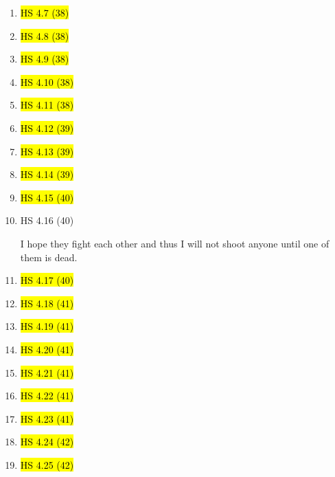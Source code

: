 \documentclass[11pt]{article}
\newcommand{\E}{\text{E}}
\newcommand{\bs}{\boldsymbol}
\newenvironment{note}{\begin{enumerate}[leftmargin=1em,topsep=0pt,noitemsep]}{\end{enumerate}}
\newenvironment{nnote}{\begin{enumerate}[leftmargin=.95em,topsep=0pt,noitemsep,label=$\bs{\cdot}$]}{\end{enumerate}}
\newcommand{\solution}{\boxed{\textbf{SOLUTION}}\hspace{.5em}}
\begin{document}
\begin{spacing}{1.1}
\begin{note}
\solution We solve the two subquestions one by one.
\begin{nnote}
\item First question is easy, and the expectation is $\$1.25X$. This means the expectation \textit{benefit} of switching is $\$0.25X$. Same is true for my opponent regardless of the value of $Y$. Therefore it seems we both should switch and will both benefit from it (which is a paradox). Furthermore, it seems we can switch forever and get our expectation benefits growing forever.
\item The correct way to solve this paradox is to replace our original prior which was in fact not a pdf (since for any $X$ we have $1/2$ and $1/2$ as probabilities and they never add to $1$ in total), with a new prior that IS a pdf. This can be demonstrated as below
$$
\E[\text{benefit}] = -m /2 + m / 2 = 0
$$
and thus switching does not yield profit at all. Also, when we actually peaked and switched, we won't be able to switch again because the benefitted one won't agree to switch back.
\end{nnote}

\item \hl{HS 4.7 (38)}
\item \hl{HS 4.8 (38)}
\item \hl{HS 4.9 (38)}
\item \hl{HS 4.10 (38)}
\item \hl{HS 4.11 (38)}
\item \hl{HS 4.12 (39)}
\item \hl{HS 4.13 (39)}
\item \hl{HS 4.14 (39)}
\item \hl{HS 4.15 (40)}

\item HS 4.16 (40)

\solution I hope they fight each other and thus I will not shoot anyone until one of them is dead.

\item \hl{HS 4.17 (40)}
\item \hl{HS 4.18 (41)}
\item \hl{HS 4.19 (41)}
\item \hl{HS 4.20 (41)}
\item \hl{HS 4.21 (41)}
\item \hl{HS 4.22 (41)}
\item \hl{HS 4.23 (41)}
\item \hl{HS 4.24 (42)}
\item \hl{HS 4.25 (42)}


\end{note}
\end{spacing}
\end{document}
